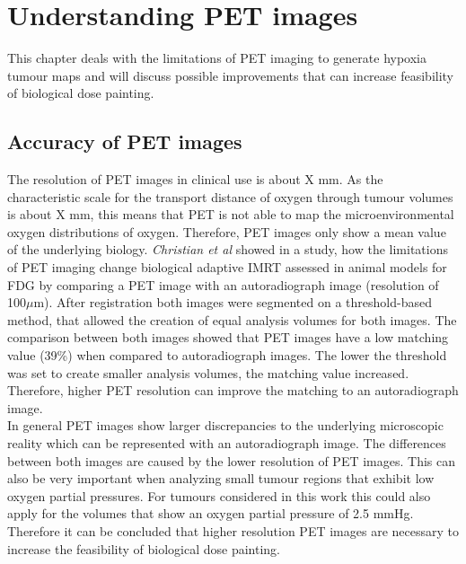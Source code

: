 
\section{Understanding PET images}
This chapter deals with the limitations of PET imaging to generate hypoxia tumour maps and will discuss possible improvements that can increase feasibility of biological dose painting.
\subsection{Accuracy of PET images}\label{chap:petaccuracy}
The resolution of PET images in clinical use is about X mm. As the characteristic scale for the transport distance of oxygen through tumour volumes is about X mm, this means that PET is not able to map the microenvironmental oxygen distributions of oxygen. Therefore, PET images only show a mean value of the underlying biology. \textit{Christian et al} \cite{pmid19097661, pmid19293465} showed in a study, how the limitations of PET imaging change biological adaptive IMRT assessed in animal models for FDG by comparing a PET image with an autoradiograph image (resolution of 100$\mu$m). After registration both images were segmented on a threshold-based method, that allowed the creation of equal analysis volumes for both images. The comparison between both images showed that PET images have a low matching value (39\%) when compared to autoradiograph images. The lower the threshold was set to create smaller analysis volumes, the matching value increased. Therefore, higher PET resolution can improve the matching to an autoradiograph image.\\In general PET images show larger discrepancies to the underlying microscopic reality which can be represented with an autoradiograph image. The differences between both images are caused by the lower resolution of PET images. This can also be very important when analyzing small tumour regions that exhibit low oxygen partial pressures. For tumours considered in this work this could also apply for the volumes that show an oxygen partial pressure of 2.5 mmHg. Therefore it can be concluded that higher resolution PET images are necessary to increase the feasibility of biological dose painting.
